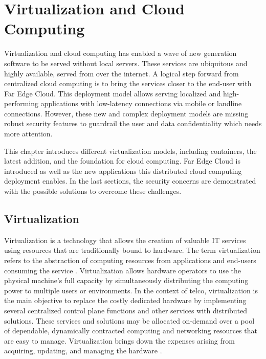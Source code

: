 \chapter{Virtualization and Cloud Computing}
\label{chapter:cloudcomputing}

Virtualization and cloud computing has enabled a wave of new generation software to be served without local servers. These services are ubiquitous and highly available, served from over the internet. A logical step forward from centralized cloud computing is to bring the services closer to the end-user with Far Edge Cloud. This deployment model allows serving localized and high-performing applications with low-latency connections via mobile or landline connections. However, these new and complex deployment models are missing robust security features to guardrail the user and data confidentiality which needs more attention.

This chapter introduces different virtualization models, including containers, the latest addition, and the foundation for cloud computing. Far Edge Cloud is introduced as well as the new applications this distributed cloud computing deployment enables. In the last sections, the security concerns are demonstrated with the possible solutions to overcome these challenges.

\section{Virtualization}

Virtualization is a technology that allows the creation of valuable IT services using resources that are traditionally bound to hardware. The term virtualization refers to the abstraction of computing resources from applications and end-users consuming the service \cite{Xing2012}. Virtualization allows hardware operators to use the physical machine's full capacity by simultaneously distributing the computing power to multiple users or environments. \cite{RedHat} In the context of telco, virtualization is the main objective to replace the costly dedicated hardware by implementing several centralized control plane functions and other services with distributed solutions. These services and solutions may be allocated on-demand over a pool of dependable, dynamically contracted computing and networking resources that are easy to manage\cite{Bosch2011}. Virtualization brings down the expenses arising from acquiring, updating, and managing the hardware \cite{Lingayat2018}\cite{Toimela2017}.

